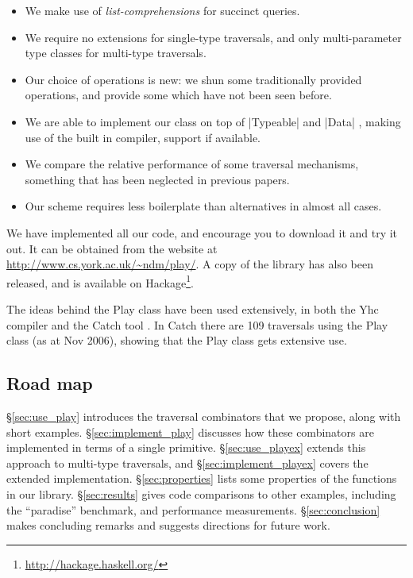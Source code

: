 \documentclass[preprint]{sigplanconf}
\begin{document}
\begin{itemize}
\item We make use of \textit{list-comprehensions} \cite{wadler:list_comprehensions} for succinct queries.
\item We require no extensions for single-type traversals, and only multi-parameter type classes for multi-type traversals.
\item Our choice of operations is new: we shun some traditionally provided operations, and provide some which have not been seen before.
\item We are able to implement our class on top of |Typeable| and |Data| \cite{lammel:syb}, making use of the built in compiler, support if available.
\item We compare the relative performance of some traversal mechanisms, something that has been neglected in previous papers.
\item Our scheme requires less boilerplate than alternatives in almost all cases.
\end{itemize}

We have implemented all our code, and encourage you to download it and try it out. It can be obtained from the website at \url{http://www.cs.york.ac.uk/~ndm/play/}. A copy of the library has also been released, and is available on Hackage\footnote{\url{http://hackage.haskell.org/}}.

The ideas behind the Play class have been used extensively, in both the Yhc compiler \cite{yhc} and the Catch tool \cite{me:catch_tfp}. In Catch there are 109 traversals using the Play class (as at Nov 2006), showing that the Play class gets extensive use.

\subsection{Road map}

\S\ref{sec:use_play} introduces the traversal combinators that we propose, along with short examples. \S\ref{sec:implement_play} discusses how these combinators are implemented in terms of a single primitive. \S\ref{sec:use_playex} extends this approach to multi-type traversals, and \S\ref{sec:implement_playex} covers the extended implementation. \S\ref{sec:properties} lists some properties of the functions in our library. \S\ref{sec:results} gives code comparisons to other examples, including the ``paradise'' benchmark, and performance measurements. \S\ref{sec:conclusion} makes concluding remarks and suggests directions for future work.
\end{document}
